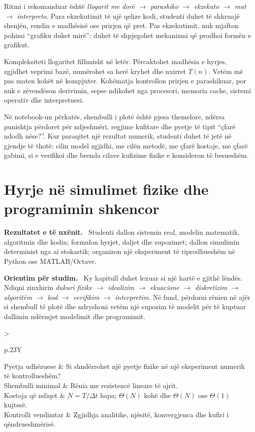 \documentclass[11pt,oneside,openany]{book}
\newenvironment{qellime}{\par\medskip\noindent\textbf{Rezultatet e të nxënit.}\ }{\par\medskip}
\newenvironment{orientim}{\par\medskip\noindent\textbf{Orientim për studim.}\ }{\par\medskip}
\newcommand{\hartakapitullit}[4]{%
\par\smallskip
\noindent\begin{tabularx}{\textwidth}{>{\bfseries\raggedright\arraybackslash}p{.23\textwidth}Y}
Pyetja udhëzuese & #1\\
Shembulli minimal & #2\\
Kostoja që ndiqet & #3\\
Kontrolli vendimtar & #4
\end{tabularx}\par\medskip}
\begin{document}
Ritmi i rekomanduar është
\emph{llogarit me dorë $\rightarrow$ parashiko $\rightarrow$ ekzekuto
$\rightarrow$ mat $\rightarrow$ interpreto}. Para ekzekutimit të një qelize
kodi, studenti duhet të shkruajë shenjën, rendin e madhësisë ose prirjen që
pret. Pas ekzekutimit, nuk mjafton pohimi ``grafiku duket mirë'': duhet të
shpjegohet mekanizmi që prodhoi formën e grafikut.

Kompleksiteti llogaritet fillimisht në letër. Përcaktohet madhësia e hyrjes,
zgjidhet veprimi bazë, numërohet sa herë kryhet dhe nxirret $T(n)$. Vetëm më
pas maten kohët në kompjuter. Kohëmatja kontrollon prirjen e parashikuar, por
nuk e zëvendëson derivimin, sepse ndikohet nga procesori, memoria cache,
sistemi operativ dhe interpretuesi.

Në notebook-un përkatës, shembulli i plotë është pjesa themelore, ndërsa
punishtja përdoret për ndjeshmëri, regjime kufitare dhe pyetje të tipit
``çfarë ndodh nëse?''. Kur paraqitet një rezultat numerik, studenti duhet të
jetë në gjendje të thotë: cilin model zgjidhi, me cilën metodë, me çfarë
kostoje, me çfarë gabimi, si e verifikoi dhe brenda cilave kufizime fizike e
konsideron të besueshëm.

\tableofcontents
\mainmatter

\chapter{Hyrje në simulimet fizike dhe programimin shkencor}
\begin{qellime}
Studenti dallon sistemin real, modelin matematik, algoritmin dhe kodin; formulon hyrjet, daljet dhe supozimet; dallon simulimin determinist nga ai stokastik; organizon një eksperiment të riprodhueshëm në Python ose MATLAB/Octave.
\end{qellime}

\begin{orientim}
Ky kapitull duhet lexuar si një hartë e gjithë lëndës. Ndiqni zinxhirin
\emph{dukuri fizike $\rightarrow$ idealizim $\rightarrow$ ekuacione
$\rightarrow$ diskretizim $\rightarrow$ algoritëm $\rightarrow$ kod
$\rightarrow$ verifikim $\rightarrow$ interpretim}. Në fund, përdorni rënien
në ajër si shembull të plotë dhe ndryshoni vetëm një supozim të modelit për të
kuptuar dallimin ndërmjet modelimit dhe programimit.
\end{orientim}

\hartakapitullit
{Si shndërrohet një pyetje fizike në një eksperiment numerik të kontrollueshëm?}
{Rënia me rezistencë lineare të ajrit.}
{$N=T/\Delta t$ hapa; $\Theta(N)$ kohë dhe $\Theta(N)$ ose $\Theta(1)$ kujtesë.}
{Zgjidhja analitike, njësitë, konvergjenca dhe kufiri i qëndrueshmërisë.}
\end{document}
